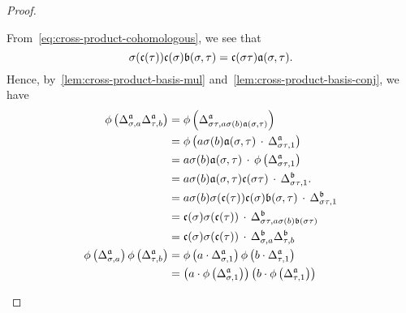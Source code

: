 \begin{proof}
\begin{enumerate}
            From~\cref{eq:cross-product-cohomologous}, we see that
            \[
            \sigma(\mathfrak{c}(\tau))\mathfrak{c}(\sigma)\mathfrak{b}(\sigma,\tau) = \mathfrak{c}(\sigma\tau)\mathfrak{a}(\sigma,\tau).\]
            Hence, by~\cref{lem:cross-product-basis-mul} and~\cref{lem:cross-product-basis-conj}, we have
            \[
            \begin{aligned}
              \phi\left(\Delta^{\mfa}_{\sigma, a}\Delta^{\mfa}_{\tau, b}\right)
              &= \phi\left(
                \Delta^{\mfa}_{\sigma\tau, a \sigma(b) \mfa(\sigma,\tau)}
                \right)\\
              &= \phi\left(
                a\sigma(b) \mfa(\sigma,\tau) \,
                \cdot \,
                \Delta^{\mfa}_{\sigma\tau, 1}
                \right)\\
              &=
                a \sigma(b) \mfa(\sigma,\tau)
                \, \cdot \,
                \phi\left(\Delta^{\mfa}_{\sigma\tau, 1}\right) \\
              &=
                a \sigma(b) \mfa(\sigma,\tau) \mfc(\sigma\tau)
                \, \cdot \,
                \Delta^{\mfb}_{\sigma\tau, 1}.\\
              &=
                a\sigma(b)\sigma(\mfc(\tau))\mfc(\sigma)\mfb(\sigma,\tau)
                \, \cdot \,
                \Delta^{\mfb}_{\sigma\tau, 1}\\
              &=
                \mfc(\sigma) \sigma(\mfc(\tau))
                \,\cdot\,
                \Delta^{\mfb}_{\sigma\tau,a\sigma(b)\mfb(\sigma\tau)}\\
              &=
                \mfc(\sigma)\sigma(\mfc(\tau))
                \, \cdot \,
                \Delta^{\mfb}_{\sigma, a}\Delta^{\mfb}_{\tau, b}
              \\
              \phi\left(\Delta^{\mfa}_{\sigma, a}\right)\phi\left(\Delta^{\mfa}_{\tau, b}\right)
              &= \phi\left(a \cdot \Delta^{\mfa}_{\sigma, 1}\right) \phi\left(b\cdot \Delta^{\mfa}_{\tau, 1}\right) \\
              &= \left(a \cdot \phi\left(\Delta^{\mfa}_{\sigma, 1}\right)\right)
                \left(b \cdot \phi\left(\Delta^{\mfa}_{\tau, 1}\right)\right) \\

\end{aligned}\]
\end{enumerate}
\end{proof}
